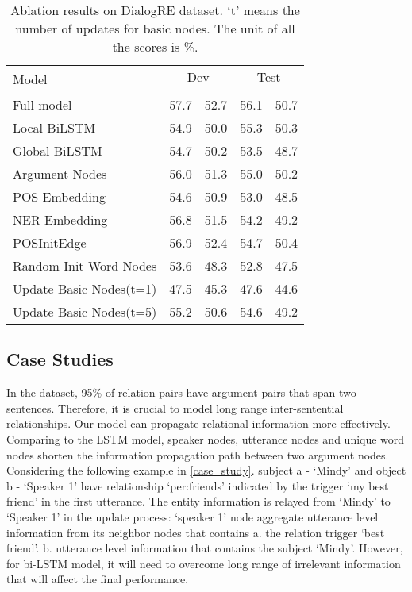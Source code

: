 \documentclass[letterpaper]{article} \usepackage{aaai21}  \usepackage{times}  \usepackage{helvet} \usepackage{courier}  \usepackage[hyphens]{url}  \usepackage{graphicx} \urlstyle{rm} \def\UrlFont{\rm}  \usepackage{natbib}  \usepackage{caption} \frenchspacing  \setlength{\pdfpagewidth}{8.5in}  \setlength{\pdfpageheight}{11in}
\begin{document}
\begin{table}[ht]
\centering
\begin{tabular}{l|cccc}
\toprule
\multirow{2}{*}{Model} &
\multicolumn{2}{c}{Dev} &
\multicolumn{2}{c}{Test} \\
&  &  &  &  \\
\midrule
Full model & 57.7 & 52.7 & 56.1 & 50.7 \\
 Local BiLSTM & 54.9 & 50.0 & 55.3 & 50.3 \\
 Global BiLSTM & 54.7 & 50.2  & 53.5 & 48.7 \\
 Argument Nodes & 56.0 & 51.3 & 55.0 & 50.2 \\
 POS Embedding & 54.6 & 50.9 & 53.0 & 48.5   \\
 NER Embedding & 56.8 & 51.5 & 54.2 & 49.2 \\
 POSInitEdge & 56.9 & 52.4 & 54.7 & 50.4 \\
\midrule
 Random Init Word Nodes & 53.6 & 48.3 & 52.8 & 47.5 \\
 Update Basic Nodes(t=1) & 47.5 & 45.3 & 47.6 & 44.6 \\
 Update Basic Nodes(t=5) & 55.2 & 50.6 & 54.6 & 49.2 \\
\bottomrule
\end{tabular}
\caption{Ablation results on DialogRE dataset. `t' means the number of updates for basic nodes. The unit of all the scores is \%.}
\label{tab:ablation}
\end{table}

\subsection{Case Studies}
In the dataset, 95\% of relation pairs have argument pairs that span two sentences. Therefore, it is crucial to model long range inter-sentential relationships. Our model can propagate relational information more effectively. Comparing to the LSTM model, speaker nodes, utterance nodes and unique word nodes shorten the information propagation path between two argument nodes. Considering the following example in \cref{case_study}. subject a - `Mindy' and object b - `Speaker 1' have relationship `per:friends' indicated by the trigger `my best friend' in the first utterance. The entity information is relayed from `Mindy' to `Speaker 1' in the update process: `speaker 1' node aggregate utterance level information from its neighbor nodes that contains a. the relation trigger `best friend'. b. utterance level information that contains the subject `Mindy'. However, for bi-LSTM model, it will need to overcome long range of irrelevant information that will affect the final performance.
\end{document}
